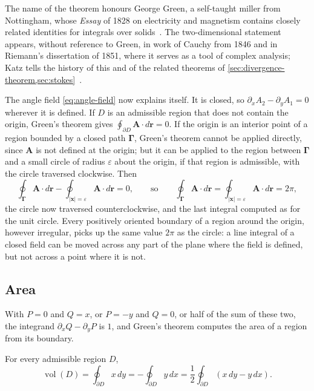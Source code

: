 The name of the theorem honours George Green, a self-taught miller from Nottingham, whose \emph{Essay} of 1828 on electricity and magnetism contains closely related identities for integrals over solids~\cite{green1828}. The two-dimensional statement appears, without reference to Green, in work of Cauchy from 1846 and in Riemann's dissertation of 1851, where it serves as a tool of complex analysis; Katz tells the history of this and of the related theorems of \cref{sec:divergence-theorem,sec:stokes}~\cite{katz1979}.

The angle field \eqref{eq:angle-field} now explains itself. It is closed, so $\partial_xA_2-\partial_yA_1=0$ wherever it is defined. If $D$ is an admissible region that does not contain the origin, Green's theorem gives $\oint_{\partial D}\mathbf A\cdot d\mathbf r=0$. If the origin is an interior point of a region bounded by a closed path $\boldsymbol\Gamma$, Green's theorem cannot be applied directly, since $\mathbf A$ is not defined at the origin; but it can be applied to the region between $\boldsymbol\Gamma$ and a small circle of radius $\varepsilon$ about the origin, if that region is admissible, with the circle traversed clockwise. Then
\[
\oint_{\boldsymbol\Gamma}\mathbf A\cdot d\mathbf r-\oint_{|\mathbf x|=\varepsilon}\mathbf A\cdot d\mathbf r=0 ,\qquad\text{so}\qquad\oint_{\boldsymbol\Gamma}\mathbf A\cdot d\mathbf r=\oint_{|\mathbf x|=\varepsilon}\mathbf A\cdot d\mathbf r=2\pi ,
\]
the circle now traversed counterclockwise, and the last integral computed as for the unit circle. Every positively oriented boundary of a region around the origin, however irregular, picks up the same value $2\pi$ as the circle: a line integral of a closed field can be moved across any part of the plane where the field is defined, but not across a point where it is not.

\subsection{Area}

With $P=0$ and $Q=x$, or $P=-y$ and $Q=0$, or half of the sum of these two, the integrand $\partial_xQ-\partial_yP$ is $1$, and Green's theorem computes the area of a region from its boundary.

\begin{corollary}
\label{cor:green-area}
For every admissible region $D$,
\[
\operatorname{vol}(D)=\oint_{\partial D}x\,dy=-\oint_{\partial D}y\,dx=\frac12\oint_{\partial D}(x\,dy-y\,dx).
\]
\end{corollary}

